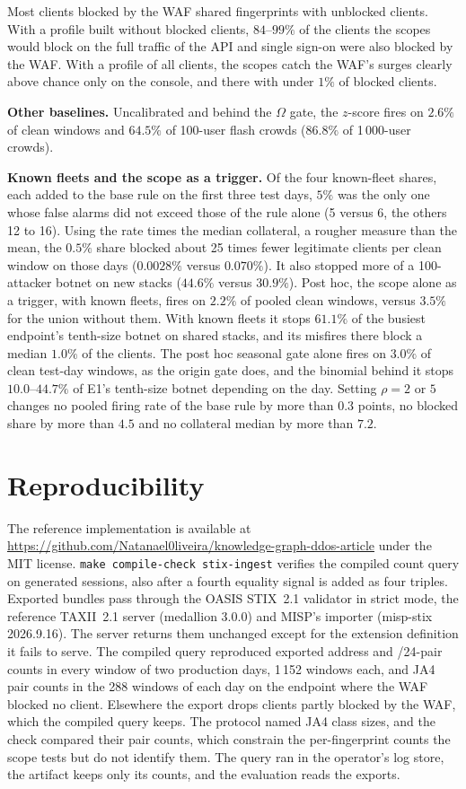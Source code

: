 \documentclass[conference,letterpaper,10pt]{IEEEtran}
\newcommand\1{\textit{(i)}}
\newcommand\2{\textit{(ii)}}
\newcommand\3{\textit{(iii)}}
\newcommand\4{\textit{(iv)}}
\newcommand\5{\textit{(v)}}
\newcommand\6{\textit{(vi)}}
\newcommand\7{\textit{(vii)}}
\newcommand\8{\textit{(viii)}}
\newcommand\9{\textit{(ix)}}
\begin{document}
Most clients blocked by the WAF shared fingerprints with unblocked clients. With a profile built without blocked clients, $84$--$99\%$ of the clients the scopes would block on the full traffic of the API and single sign-on were also blocked by the WAF. With a profile of all clients, the scopes catch the WAF's surges clearly above chance only on the console, and there with under $1\%$ of blocked clients.

\textbf{Other baselines.} Uncalibrated and behind the $\Omega$ gate, the $z$-score fires on $2.6\%$ of clean windows and $64.5\%$ of 100-user flash crowds ($86.8\%$ of 1\,000-user crowds).

\textbf{Known fleets and the scope as a trigger.} Of the four known-fleet shares, each added to the base rule on the first three test days, $5\%$ was the only one whose false alarms did not exceed those of the rule alone (5 versus 6, the others 12 to 16). Using the rate times the median collateral, a rougher measure than the mean, the $0.5\%$ share blocked about 25 times fewer legitimate clients per clean window on those days ($0.0028\%$ versus $0.070\%$). It also stopped more of a 100-attacker botnet on new stacks ($44.6\%$ versus $30.9\%$). Post hoc, the scope alone as a trigger, with known fleets, fires on $2.2\%$ of pooled clean windows, versus $3.5\%$ for the union without them. With known fleets it stops $61.1\%$ of the busiest endpoint's tenth-size botnet on shared stacks, and its misfires there block a median $1.0\%$ of the clients. The post hoc seasonal gate alone fires on $3.0\%$ of clean test-day windows, as the origin gate does, and the binomial behind it stops $10.0$--$44.7\%$ of E1's tenth-size botnet depending on the day. Setting $\rho = 2$ or $5$ changes no pooled firing rate of the base rule by more than $0.3$ points, no blocked share by more than $4.5$ and no collateral median by more than $7.2$.

\section{Reproducibility}
\label{app:repro}

The reference implementation is available at
\url{https://github.com/Natanael0liveira/knowledge-graph-ddos-article} under the
MIT license. \texttt{make compile-check stix-ingest} verifies the compiled count query on generated sessions, also after a fourth equality signal is added as four triples. Exported bundles pass through the OASIS STIX~2.1 validator in strict mode, the reference TAXII~2.1 server (medallion 3.0.0) and MISP's importer (misp-stix 2026.9.16). The server returns them unchanged except for the extension definition it fails to serve. The compiled query reproduced exported address and /24-pair counts in every window of two production days, 1\,152 windows each, and JA4 pair counts in the 288 windows of each day on the endpoint where the WAF blocked no client. Elsewhere the export drops clients partly blocked by the WAF, which the compiled query keeps. The protocol named JA4 class sizes, and the check compared their pair counts, which constrain the per-fingerprint counts the scope tests but do not identify them. The query ran in the operator's log store, the artifact keeps only its counts, and the evaluation reads the exports.
\end{document}
